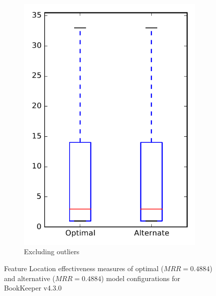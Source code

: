 \begin{figure}
\begin{subfigure}{.4\textwidth}
        \includegraphics[height=0.4\textheight]{figures/combo/flt_rq1_bookkeeper_no_outlier}
        \caption{Excluding outliers}\label{fig:combo:flt:rq1:bookkeeper_no_outlier}
    \end{subfigure}
\caption[Feature Location effectiveness measures of optimal and alternative model configurations for BookKeeper v4.3.0]%
{Feature Location effectiveness measures of optimal ($MRR=0.4884$) and alternative ($MRR=0.4884$) model configurations for BookKeeper v4.3.0}
\label{fig:combo:flt:rq1:bookkeeper}
\end{figure}
